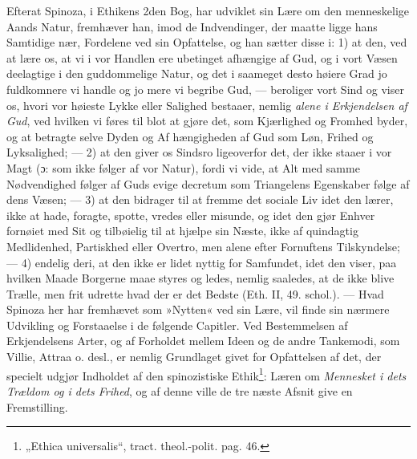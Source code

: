 \documentclass[12pt,a4paper]{book}
\newcommand{\opage}[1]{\marginnote{\footnotesize\textit{[#1]}}}
\begin{document}
Efterat Spinoza, i Ethikens 2den Bog, har udviklet sin Lære om den
menneskelige Aands Natur, fremhæver han, imod de Indvendinger, der
maatte ligge hans Samtidige nær, Fordelene ved sin Opfattelse, og
han sætter disse i: 1) at den, ved at lære os, at vi i vor Handlen
ere ubetinget afhængige af Gud, og i vort Væsen deelagtige i den
guddommelige Natur, og det i saameget desto høiere Grad jo
fuldkomnere vi handle og jo mere vi begribe Gud, --- beroliger vort
Sind og viser os, hvori vor høieste Lykke eller Salighed bestaaer,
nemlig \emph{alene i Erkjendelsen af Gud}, ved hvilken vi føres til
blot at gjøre det, som Kjærlighed og Fromhed byder, og at betragte
selve Dyden og Af\-%
\opage{108}\setcounter{footnote}{0}%
hængigheden af Gud som Løn, Frihed og Lyksalighed; ---
2) at den giver os Sindsro ligeoverfor det, der ikke staaer
i vor Magt (ɔ: som ikke følger af vor Natur), fordi vi vide,
at Alt med samme Nødvendighed følger af Guds evige decretum
som Triangelens Egenskaber følge af dens Væsen; --- 3) at den
bidrager til at fremme det sociale Liv idet den lærer, ikke at
hade, foragte, spotte, vredes eller misunde, og idet den gjør
Enhver fornøiet med Sit og tilbøielig til at hjælpe sin Næste,
ikke af quindagtig Medlidenhed, Partiskhed eller Overtro, men
alene efter Fornuftens Tilskyndelse; --- 4) endelig deri, at den
ikke er lidet nyttig for Samfundet, idet den viser, paa hvilken
Maade Borgerne maae styres og ledes, nemlig saaledes, at de
ikke blive Trælle, men frit udrette hvad der er det Bedste (Eth.
II, 49. schol.). --- Hvad Spinoza her har fremhævet som »Nytten«
ved sin Lære, vil finde sin nærmere Udvikling og Forstaaelse i
de følgende Capitler. Ved Bestemmelsen af Erkjendelsens Arter,
og af Forholdet mellem Ideen og de andre Tankemodi, som Villie,
Attraa o. desl., er nemlig Grundlaget givet for Opfattelsen af
det, der specielt udgjør Indholdet af den spinozistiske
Ethik\footnote{„Ethica universalis“, tract. theol.-polit. pag. 46.}:
Læren om \emph{Mennesket i dets Trældom og i dets Frihed}, og af
denne ville de tre næste Afsnit give en Fremstilling.
\end{document}
